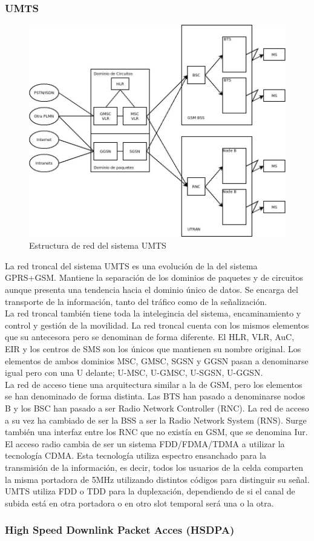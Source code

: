 \subsubsection{UMTS}
\label{ssub:UMTS}
\begin{figure}[H]
\centering
\includegraphics[width=\textwidth]{Imagen/diaUMTS.jpg}
\caption{Estructura de red del sistema UMTS}
\label{img:UMTS}
\end{figure}
La red troncal del sistema UMTS es una evolución de la del sistema GPRS+GSM. Mantiene la separación de los dominios de paquetes y de circuitos aunque presenta una tendencia hacia el dominio único de datos. Se encarga del transporte de la información, tanto del tráfico como de la señalización.\\
La red troncal también tiene toda la intelegincia del sistema, encaminamiento y control y gestión de la movilidad. La red troncal cuenta con los mismos elementos que su antecesora pero se denominan de forma diferente. El HLR, VLR, AuC, EIR y los centros de SMS son los únicos que mantienen su nombre original. Los elementos de ambos dominios MSC, GMSC, SGSN y GGSN pasan a denominarse igual pero con una U delante; U-MSC, U-GMSC, U-SGSN, U-GGSN.\\
La red de acceso tiene una arquitectura similar a la de GSM, pero los elementos se han denominado de forma distinta. Las BTS han pasado a denominarse nodos B y los BSC han pasado a ser Radio Network Controller (RNC). La red de acceso a su vez ha cambiado de ser la BSS a ser la Radio Network System (RNS). Surge también una interfaz entre los RNC que no existía en GSM, que se denomina Iur. El acceso radio cambia de ser un sistema FDD/FDMA/TDMA a utilizar la tecnología CDMA. Esta tecnología utiliza espectro ensanchado para la transmisión de la información, es decir, todos los usuarios de la celda comparten la misma portadora de 5MHz utilizando distintos códigos para distinguir su señal. UMTS utiliza FDD o TDD para la duplexación, dependiendo de si el canal de subida está en otra portadora o en otro slot temporal será una o la otra.
\subsubsection{High Speed Downlink Packet Acces (HSDPA)}
\label{ssub:HSDPA}

